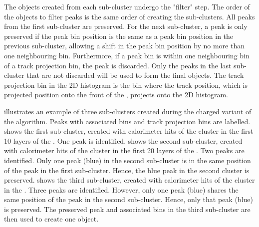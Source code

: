 The \ShowerPeak objects created from each sub-cluster undergo the "\ShowerPeak filter" step. The order of the \ShowerPeak objects to filter peaks is the same order of creating the sub-clusters. All peaks from the first sub-cluster are preserved. For the next sub-cluster, a peak  is only preserved if the peak bin position is the same as a peak bin position in the previous sub-cluster, allowing a shift in the peak bin position by no more than one neighbouring bin. Furthermore, if a peak bin is within one neighbouring bin of a track projection bin, the peak is discarded. Only the peaks in the last sub-cluster that are not discarded will be used to form the final \ShowerPeak objects. The track projection bin in the 2D histogram is the bin where the track position, which is projected position onto the front of the \ECAL, projects onto the 2D histogram.




 illustrates an example of three sub-clusters created during the charged variant of the \peakFinding algorithm. Peaks with associated bins and track projection bins are labelled.  shows the first sub-cluster, created with calorimeter hits of the cluster in the first 10 layers of the \ECAL. One peak is identified.  shows the second sub-cluster, created with calorimeter hits of the cluster in the first 20 layers of the \ECAL. Two peaks are identified. Only one peak (blue) in the second sub-cluster is in the same position of the peak in the first sub-cluster. Hence, the blue peak in the second cluster is preserved.  shows the third sub-cluster, created with calorimeter hits of the cluster in the \ECAL. Three peaks are identified. However, only one peak (blue) shares the  same position of the peak in the second sub-cluster. Hence, only that peak (blue) is preserved. The preserved peak and associated bins in the third sub-cluster are then used to create one \ShowerPeak object.



